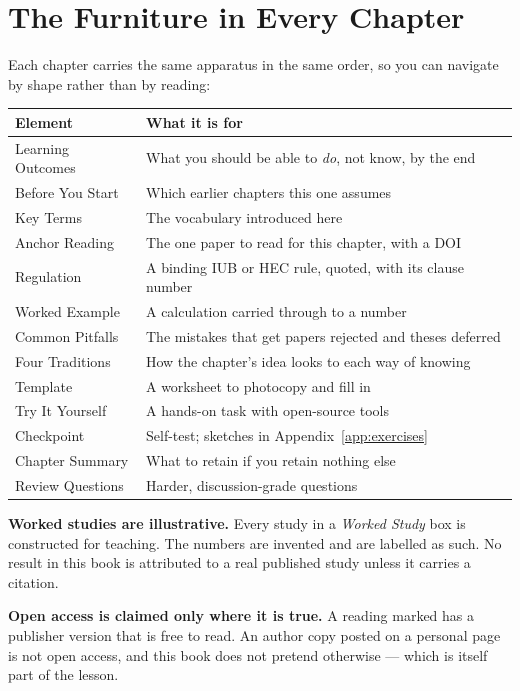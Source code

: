 \section*{The Furniture in Every Chapter}

Each chapter carries the same apparatus in the same order, so you can navigate
by shape rather than by reading:

\begin{center}
\small
\begin{tabular}{@{}lL{10.4cm}@{}}
\toprule
\textbf{Element} & \textbf{What it is for} \\
\midrule
Learning Outcomes   & What you should be able to \emph{do}, not know, by the end \\
Before You Start    & Which earlier chapters this one assumes \\
Key Terms           & The vocabulary introduced here \\
Anchor Reading      & The one paper to read for this chapter, with a DOI \\
Regulation          & A binding IUB or HEC rule, quoted, with its clause number \\
Worked Example      & A calculation carried through to a number \\
Common Pitfalls     & The mistakes that get papers rejected and theses deferred \\
Four Traditions     & How the chapter's idea looks to each way of knowing \\
Template            & A worksheet to photocopy and fill in \\
Try It Yourself     & A hands-on task with open-source tools \\
Checkpoint          & Self-test; sketches in Appendix~\ref{app:exercises} \\
Chapter Summary     & What to retain if you retain nothing else \\
Review Questions    & Harder, discussion-grade questions \\
\bottomrule
\end{tabular}
\end{center}

\begin{alertbox}
\textbf{Worked studies are illustrative.} Every study in a
\emph{Worked Study} box is constructed for teaching. The numbers are invented
and are labelled as such. No result in this book is attributed to a real
published study unless it carries a citation.

\medskip
\textbf{Open access is claimed only where it is true.} A reading marked
\oa{} has a publisher version that is free to read. An author copy posted on a
personal page is not open access, and this book does not pretend otherwise ---
which is itself part of the lesson.
\end{alertbox}


